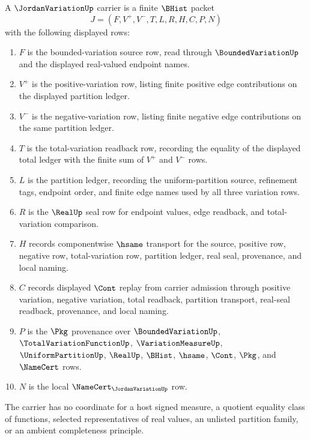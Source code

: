 \begin{definition}
\label{def:jordan-variation-carrier}
A $\JordanVariationUp$ carrier is a finite $\BHist$ packet
$$
J=(F,V^{+},V^{-},T,L,R,H,C,P,N)
$$
with the following displayed rows:
\begin{enumerate}
\item $F$ is the bounded-variation source row, read through $\BoundedVariationUp$ and the displayed real-valued endpoint names.
\item $V^{+}$ is the positive-variation row, listing finite positive edge contributions on the displayed partition ledger.
\item $V^{-}$ is the negative-variation row, listing finite negative edge contributions on the same partition ledger.
\item $T$ is the total-variation readback row, recording the equality of the displayed total ledger with the finite sum of $V^{+}$ and $V^{-}$ rows.
\item $L$ is the partition ledger, recording the uniform-partition source, refinement tags, endpoint order, and finite edge names used by all three variation rows.
\item $R$ is the $\RealUp$ seal row for endpoint values, edge readback, and total-variation comparison.
\item $H$ records componentwise $\hsame$ transport for the source, positive row, negative row, total-variation row, partition ledger, real seal, provenance, and local naming.
\item $C$ records displayed $\Cont$ replay from carrier admission through positive variation, negative variation, total readback, partition transport, real-seal readback, provenance, and local naming.
\item $P$ is the $\Pkg$ provenance over $\BoundedVariationUp$, $\TotalVariationFunctionUp$, $\VariationMeasureUp$, $\UniformPartitionUp$, $\RealUp$, $\BHist$, $\hsame$, $\Cont$, $\Pkg$, and $\NameCert$ rows.
\item $N$ is the local $\NameCert_{\JordanVariationUp}$ row.
\end{enumerate}
The carrier has no coordinate for a host signed measure, a quotient equality class of functions, selected representatives of real values, an unlisted partition family, or an ambient completeness principle.
\end{definition}

